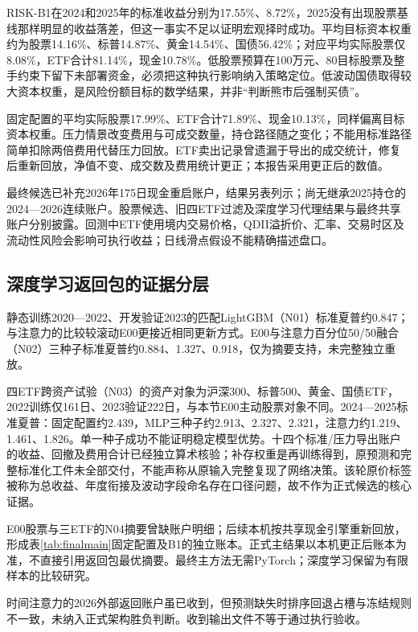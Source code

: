 \documentclass[12pt]{article}
\begin{document}
RISK-B1在2024和2025年的标准收益分别为17.55\%、8.72\%，2025没有出现股票基线那样明显的收益落差，但这一事实不足以证明宏观择时成功。平均目标资本权重约为股票14.16\%、标普14.87\%、黄金14.54\%、国债56.42\%；对应平均实际股票仅8.08\%，ETF合计81.14\%，现金10.78\%。低股票预算在100万元、80目标股票及整手约束下留下未部署资金，必须把这种执行影响纳入策略定位。低波动国债取得较大资本权重，是风险份额目标的数学结果，并非“判断熊市后强制买债”。

固定配置的平均实际股票17.99\%、ETF合计71.89\%、现金10.13\%，同样偏离目标资本权重。压力情景改变费用与可成交数量，持仓路径随之变化；不能用标准路径简单扣除两倍费用代替压力回放。ETF卖出记录曾遗漏于导出的成交统计，修复后重新回放，净值不变、成交数及费用统计更正；本报告采用更正后的数值。

最终候选已补充2026年175日现金重启账户，结果另表列示；尚无继承2025持仓的2024—2026连续账户。股票候选、旧四ETF过滤及深度学习代理结果与最终共享账户分别披露。回测中ETF使用境内交易价格，QDII溢折价、汇率、交易时区及流动性风险会影响可执行收益；日线滑点假设不能精确描述盘口。

\subsection{深度学习返回包的证据分层}
静态训练2020—2022、开发验证2023的匹配LightGBM（N01）标准夏普约0.847；与注意力的比较较滚动E00更接近相同更新方式。E00与注意力百分位50/50融合（N02）三种子标准夏普约0.884、1.327、0.918，仅为摘要支持，未完整独立重放。

四ETF跨资产试验（N03）的资产对象为沪深300、标普500、黄金、国债ETF，2022训练仅161日、2023验证222日，与本节E00主动股票对象不同。2024—2025标准夏普：固定配置约2.439，MLP三种子约2.913、2.327、2.321，注意力约1.219、1.461、1.826。单一种子成功不能证明稳定模型优势。十四个标准/压力导出账户的收益、回撤及费用合计已经独立算术核验；补存权重是再训练得到，原预测和完整标准化工件未全部交付，不能声称从原输入完整复现了网络决策。该轮原价标签被称为总收益、年度衔接及波动字段命名存在口径问题，故不作为正式候选的核心证据。

E00股票与三ETF的N04摘要曾缺账户明细；后续本机按共享现金引擎重新回放，形成表\ref{tab:finalmain}固定配置及B1的独立账本。正式主结果以本机更正后账本为准，不直接引用返回包最优摘要。最终主方法无需PyTorch；深度学习保留为有限样本的比较研究。

时间注意力的2026外部返回账户虽已收到，但预测缺失时排序回退占槽与冻结规则不一致，未纳入正式架构胜负判断。收到输出文件不等于通过执行验收。
\end{document}
